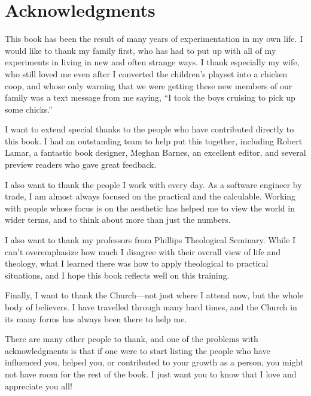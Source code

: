 \chapter*{Acknowledgments}

This book has been the result of many years of experimentation in my own life.
I would like to thank my family first, who has had to put up with all of my 
experiments in living in new and often strange ways.  I thank especially my
wife, who still loved me even after I converted the children's playset into 
a chicken coop, and whose only warning that we were getting these new members
of our family was a text message from me saying,
``I took the boys cruising to pick up some chicks.''  

I want to extend special thanks to the people who have contributed directly
to this book.  I had an outstanding team to help put this together, including
Robert Lamar, a fantastic book designer, Meghan Barnes, an excellent editor,
and several preview readers who gave great feedback.

I also want to thank the people I work with every day.  As a software engineer
by trade, I am almost always focused on the practical and the calculable.
Working with people whose focus is on the aesthetic has helped me to 
view the world in wider terms, and to think about more than just the numbers.

I also want to thank my professors from Phillips Theological Seminary.
While I can't overemphasize how much I disagree with their overall view of life
and theology, what I learned there was how to apply theological to
practical situations, and I hope this book reflects well on this training.  

Finally, I want to thank the Church---not just where I attend now, but the 
whole body of believers.  I have travelled through many hard times, and the
Church in its many forms has always been there to help me.

There are many other people to thank, and one of the problems with acknowledgments
is that if one were to start listing the people who have influenced you, helped you,
or contributed to your growth as a person, you might not have room for the rest
of the book.  I just want you to know that I love and appreciate you all!
